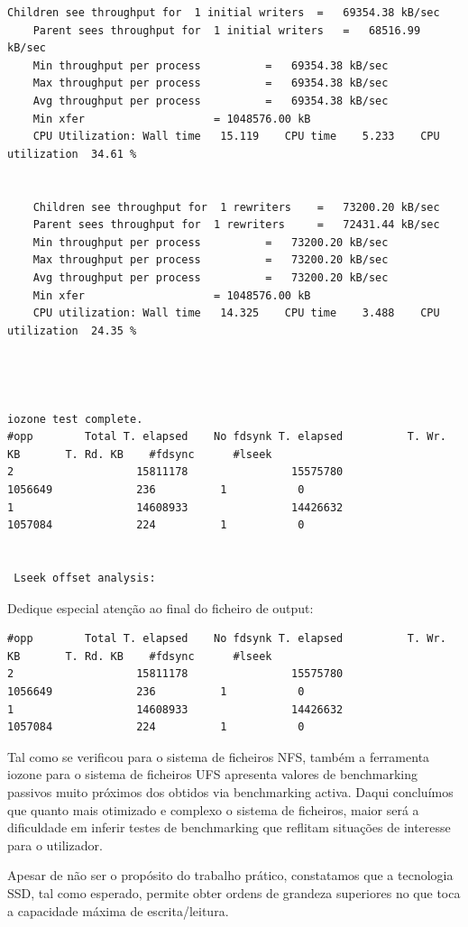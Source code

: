 \documentclass[a4paper]{article}
\begin{document}
{\begin{lstlisting}[style=output]
	Children see throughput for  1 initial writers 	=   69354.38 kB/sec
	Parent sees throughput for  1 initial writers 	=   68516.99 kB/sec
	Min throughput per process 			=   69354.38 kB/sec 
	Max throughput per process 			=   69354.38 kB/sec
	Avg throughput per process 			=   69354.38 kB/sec
	Min xfer 					= 1048576.00 kB
	CPU Utilization: Wall time   15.119    CPU time    5.233    CPU utilization  34.61 %


	Children see throughput for  1 rewriters 	=   73200.20 kB/sec
	Parent sees throughput for  1 rewriters 	=   72431.44 kB/sec
	Min throughput per process 			=   73200.20 kB/sec 
	Max throughput per process 			=   73200.20 kB/sec
	Avg throughput per process 			=   73200.20 kB/sec
	Min xfer 					= 1048576.00 kB
	CPU utilization: Wall time   14.325    CPU time    3.488    CPU utilization  24.35 %




iozone test complete.
#opp 	    Total T. elapsed	No fdsynk T. elapsed	      T. Wr. KB	      T. Rd. KB	   #fdsync	    #lseek
2    	            15811178	            15575780	        1056649	            236	         1	         0
1    	            14608933	            14426632	        1057084	            224	         1	         0


 Lseek offset analysis:
\end{lstlisting}

Dedique especial atenção ao final do ficheiro de output:


\begin{lstlisting}[style=command,basicstyle=\scriptsize]
#opp 	    Total T. elapsed	No fdsynk T. elapsed	      T. Wr. KB	      T. Rd. KB	   #fdsync	    #lseek
2    	            15811178	            15575780	        1056649	            236	         1	         0
1    	            14608933	            14426632	        1057084	            224	         1	         0
\end{lstlisting}

Tal como se verificou para o sistema de ficheiros NFS, também a ferramenta iozone para o sistema de ficheiros UFS apresenta valores de benchmarking passivos muito próximos dos obtidos via benchmarking activa. Daqui concluímos que quanto mais otimizado e complexo o sistema de ficheiros, maior será a dificuldade em inferir testes de benchmarking que reflitam situações de interesse para o utilizador.\par 
Apesar de não ser o propósito do trabalho prático, constatamos que a tecnologia SSD, tal como esperado, permite obter ordens de grandeza superiores no que toca a capacidade máxima de escrita/leitura.


}
\end{document}
